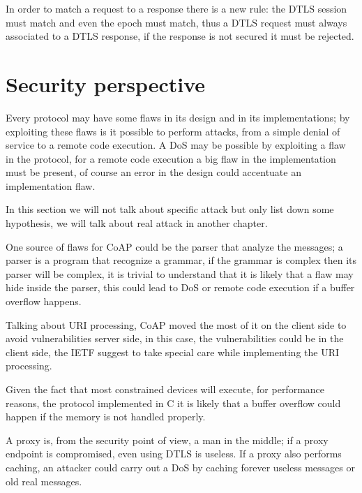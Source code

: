 	In order to match a request to a response there is a new rule: the DTLS session must match and even the epoch must match, thus a DTLS request must always associated to a DTLS response, if the response is not secured it must be rejected.
	
	\section{Security perspective}\label{sc:security_persp_coap}
	Every protocol may have some flaws in its design and in its implementations; by exploiting these flaws is it possible to perform attacks, from a simple denial of service to a remote code execution.\newline
	A DoS may be possible by exploiting a flaw in the protocol, for a remote code execution a big flaw in the implementation must be present, of course an error in the design could accentuate an implementation flaw.\newline
	
	In this section we will not talk about specific attack but only list down some hypothesis, we will talk about real attack in another chapter.\newline
	
	One source of flaws for CoAP could be the parser that analyze the messages; a parser is a program that recognize a grammar, if the grammar is complex then its parser will be complex, it is trivial to understand that it is likely that a flaw may hide inside the parser, this could lead to DoS or remote code execution if a buffer overflow happens.\newline
	
	Talking about URI processing, CoAP moved the most of it on the client side to avoid vulnerabilities server side, in this case, the vulnerabilities could be in the client side, the IETF suggest to take special care while implementing the URI processing.\newline
	
	Given the fact that most constrained devices will execute, for performance reasons, the protocol implemented in C it is likely that a buffer overflow could happen if the memory is not handled properly. \newline
	
	A proxy is, from the security point of view, a man in the middle; if a proxy endpoint is compromised, even using DTLS is useless.\newline
	If a proxy also performs caching, an attacker could carry out a DoS by caching forever useless messages or old real messages.\newline
	
